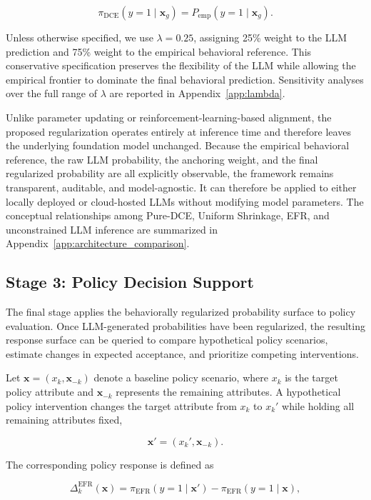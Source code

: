 \documentclass[11pt]{article}
\begin{document}
\[
\pi_{\mathrm{DCE}}(y=1\mid\mathbf{x}_g)
=
P_{\mathrm{emp}}(y=1\mid\mathbf{x}_g).
\]

Unless otherwise specified, we use $\lambda=0.25$, assigning 25\% weight to the LLM prediction and 75\% weight to the empirical behavioral reference. This conservative specification preserves the flexibility of the LLM while allowing the empirical frontier to dominate the final behavioral prediction. Sensitivity analyses over the full range of $\lambda$ are reported in Appendix~\ref{app:lambda}.

Unlike parameter updating or reinforcement-learning-based alignment, the proposed regularization operates entirely at inference time and therefore leaves the underlying foundation model unchanged. Because the empirical behavioral reference, the raw LLM probability, the anchoring weight, and the final regularized probability are all explicitly observable, the framework remains transparent, auditable, and model-agnostic. It can therefore be applied to either locally deployed or cloud-hosted LLMs without modifying model parameters. The conceptual relationships among Pure-DCE, Uniform Shrinkage, EFR, and unconstrained LLM inference are summarized in Appendix~\ref{app:architecture_comparison}.

\subsection{Stage 3: Policy Decision Support}
\label{sec:stage3}

The final stage applies the behaviorally regularized probability surface to policy evaluation. Once LLM-generated probabilities have been regularized, the resulting response surface can be queried to compare hypothetical policy scenarios, estimate changes in expected acceptance, and prioritize competing interventions.

Let $\mathbf{x}=(x_k,\mathbf{x}_{-k})$ denote a baseline policy scenario, where $x_k$ is the target policy attribute and $\mathbf{x}_{-k}$ represents the remaining attributes. A hypothetical policy intervention changes the target attribute from $x_k$ to $x_k'$ while holding all remaining attributes fixed,

\[
\mathbf{x}'=(x_k',\mathbf{x}_{-k}).
\]

The corresponding policy response is defined as

\[
\Delta_k^{\mathrm{EFR}}(\mathbf{x})
=
\pi_{\mathrm{EFR}}(y=1\mid\mathbf{x}')
-
\pi_{\mathrm{EFR}}(y=1\mid\mathbf{x}),
\]
\end{document}
